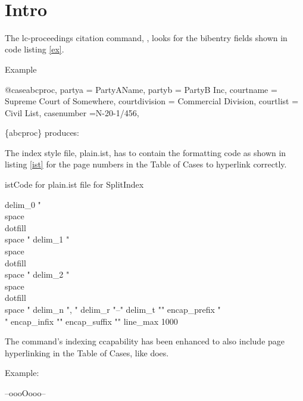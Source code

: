 
\maketitle
\tableofcontents

\let\xoldtwocolumn\twocolumn
\iftoggle{printlegtoc}{%
\let\oldtwocolumn\twocolumn
\renewcommand{\twocolumn}[1][]{#1}
\let\oldclearpage\clearpage
\renewcommand\clearpage{\relax}
\printindex[cases]
\printindex[legislation]
\iftoggle{printregulations}{\printindex[regulations]}{}
\renewcommand{\twocolumn}[1][]{\oldtwocolumn}
\renewcommand\clearpage{\oldclearpage}
}{}
\bigskip
\hfill{}\hfill\ %
\bigskip




\section{Intro}
The lc-proceedings citation command, , looks for the bibentry fields shown in code listing \ref{ex}.

\begin{dov}{ex}{Example}

@case{abcproc,
  partya = {PartyAName},
  partyb = {PartyB Inc},
  courtname = {Supreme Court of Somewhere},
  courtdivision = {Commercial Division},
  courtlist = {Civil List},
  casenumber ={N-20-1/456},
}

\end{dov}

\{abcproc\} produces: 

\bigskip

The index style file, plain.ist, has to contain the formatting code as shown in listing \ref{ist} for the page numbers in the Table of Cases to hyperlink correctly.


\begin{dov}{ist}{Code for plain.ist file for SplitIndex}

delim_0 "\\space\\dotfill\\space "\hss
delim_1 "\\space\\dotfill\\space "\hss
delim_2 "\\space\\dotfill\\space "\hss
delim_n ", "
delim_r "--"
delim_t ""
encap_prefix "\\"
encap_infix "{"
encap_suffix "}"
line_max 1000

\end{dov}


\newpage
{}

\newpage
The  command's indexing ccapability has been enhanced to also include page hyperlinking in the Table of Cases, like  does.

Example:



\bigskip
\bigskip
\hfill --oooOooo--\hfill\ 








